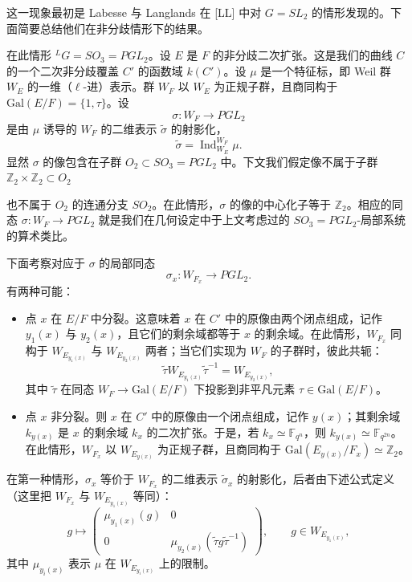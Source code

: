 这一现象最初是 Labesse 与 Langlands 在 [LL] 中对 $G=SL_2$ 的情形发现的。下面简要总结他们在非分歧情形下的结果。

在此情形 ${}^{L}G=SO_3=PGL_2$。设 $E$ 是 $F$ 的非分歧二次扩张。这是我们的曲线 $C$ 的一个二次非分歧覆盖 $C'$ 的函数域 $k(C')$。设 $\mu$ 是一个特征标，即 Weil 群 $W_E$ 的一维（$\ell$-进）表示。群 $W_F$ 以 $W_E$ 为正规子群，且商同构于 $\mathrm{Gal}(E/F)=\{1,\tau\}$。设
\[
\sigma: W_F\to PGL_2
\]
是由 $\mu$ 诱导的 $W_F$ 的二维表示 $\tilde\sigma$ 的射影化，
\[
\tilde\sigma = \operatorname{Ind}_{W_E}^{W_F}\mu.
\]
显然 $\sigma$ 的像包含在子群 $O_2\subset SO_3=PGL_2$ 中。下文我们假定像不属于子群 $\mathbb{Z}_2\times\mathbb{Z}_2\subset O_2$


也不属于 $O_2$ 的连通分支 $SO_2$。在此情形，$\sigma$ 的像的中心化子等于 $\mathbb{Z}_2$。相应的同态 $\sigma: W_F\to PGL_2$ 就是我们在几何设定中于上文考虑过的 $SO_3=PGL_2$-局部系统的算术类比。

下面考察对应于 $\sigma$ 的局部同态
\[
\sigma_x: W_{F_x}\to PGL_2.
\]
有两种可能：
\begin{itemize}[leftmargin=2em,itemsep=2pt,topsep=2pt]
\item 点 $x$ 在 $E/F$ 中分裂。这意味着 $x$ 在 $C'$ 中的原像由两个闭点组成，记作 $y_1(x)$ 与 $y_2(x)$，且它们的剩余域都等于 $x$ 的剩余域。在此情形，$W_{F_x}$ 同构于 $W_{E_{y_1(x)}}$ 与 $W_{E_{y_2(x)}}$ 两者；当它们实现为 $W_F$ 的子群时，彼此共轭：
\[
\tilde\tau W_{E_{y_1(x)}}\tilde\tau^{-1} = W_{E_{y_2(x)}},
\]
其中 $\tilde\tau$ 在同态 $W_F\to\mathrm{Gal}(E/F)$ 下投影到非平凡元素 $\tau\in\mathrm{Gal}(E/F)$。
\item 点 $x$ 非分裂。则 $x$ 在 $C'$ 中的原像由一个闭点组成，记作 $y(x)$；其剩余域 $k_{y(x)}$ 是 $x$ 的剩余域 $k_x$ 的二次扩张。于是，若 $k_x\simeq\mathbb{F}_{q^n}$，则 $k_{y(x)}\simeq\mathbb{F}_{q^{2n}}$。在此情形，$W_{F_x}$ 以 $W_{E_{y(x)}}$ 为正规子群，且商同构于 $\mathrm{Gal}(E_{y(x)}/F_x)\simeq\mathbb{Z}_2$。
\end{itemize}

在第一种情形，$\sigma_x$ 等价于 $W_{F_x}$ 的二维表示 $\tilde\sigma_x$ 的射影化，后者由下述公式定义（这里把 $W_{F_x}$ 与 $W_{E_{y_1(x)}}$ 等同）：
\begin{equation}\tag{7.3}
g\mapsto\begin{pmatrix}\mu_{y_1(x)}(g)&0\\ 0&\mu_{y_2(x)}(\tilde\tau g\tilde\tau^{-1})\end{pmatrix},
\qquad g\in W_{E_{y_1(x)}},
\end{equation}
其中 $\mu_{y_i(x)}$ 表示 $\mu$ 在 $W_{E_{y_i(x)}}$ 上的限制。

